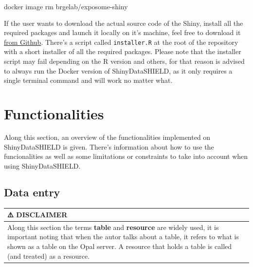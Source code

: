 \documentclass[
]{book}
\newenvironment{Shaded}{\begin{snugshade}}{\end{snugshade}}
\newcommand{\ExtensionTok}[1]{#1}
\newcommand{\NormalTok}[1]{#1}
\begin{document}
\begin{Shaded}
\begin{Highlighting}[]
\ExtensionTok{docker}\NormalTok{ image rm brgelab/exposome-shiny}
\end{Highlighting}
\end{Shaded}

If the user wants to download the actual source code of the Shiny, install all the required packages and launch it locally on it's machine, feel free to download it \href{https://github.com/isglobal-brge/dsOmicsShiny}{from Github}. There's a script called \texttt{installer.R} at the root of the repository with a short installer of all the required packages. Please note that the installer script may fail depending on the R version and others, for that reason is advised to always run the Docker version of ShinyDataSHIELD, as it only requires a single terminal command and will work no matter what.

\hypertarget{functionalities}{%
\chapter{Functionalities}\label{functionalities}}

Along this section, an overview of the functionalities implemented on ShinyDataSHIELD is given. There's information about how to use the funcionalities as well as some limitations or constraints to take into account when using ShinyDataSHIELD.

\hypertarget{data-entry}{%
\section{Data entry}\label{data-entry}}

\begin{longtable}[]{@{}l@{}}
\toprule
\begin{minipage}[b]{0.97\columnwidth}\raggedright
⚠️ DISCLAIMER\strut
\end{minipage}\tabularnewline
\midrule
\endhead
\begin{minipage}[t]{0.97\columnwidth}\raggedright
Along this section the terms \textbf{table} and \textbf{resource} are widely used, it is important noting that when the autor talks about a table, it refers to what is shown as a table on the Opal server. A resource that holds a table is called (and treated) as a resource.\strut
\end{minipage}\tabularnewline
\bottomrule
\end{longtable}
\end{document}
